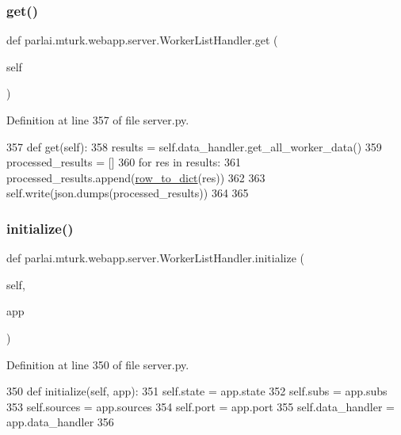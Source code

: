\subsubsection{\texorpdfstring{get()}{get()}}
{\footnotesize\ttfamily def parlai.\+mturk.\+webapp.\+server.\+Worker\+List\+Handler.\+get (\begin{DoxyParamCaption}\item[{}]{self }\end{DoxyParamCaption})}



Definition at line 357 of file server.\+py.


\begin{DoxyCode}
357     \textcolor{keyword}{def }get(self):
358         results = self.data\_handler.get\_all\_worker\_data()
359         processed\_results = []
360         \textcolor{keywordflow}{for} res \textcolor{keywordflow}{in} results:
361             processed\_results.append(\hyperlink{namespaceparlai_1_1mturk_1_1webapp_1_1server_a92be47964fa33a4b6a14d4069d091c7d}{row\_to\_dict}(res))
362 
363         self.write(json.dumps(processed\_results))
364 
365 
\end{DoxyCode}
\mbox{\label{classparlai_1_1mturk_1_1webapp_1_1server_1_1WorkerListHandler_ad375655741a045539a790aa1eb8878df}} 
\subsubsection{\texorpdfstring{initialize()}{initialize()}}
{\footnotesize\ttfamily def parlai.\+mturk.\+webapp.\+server.\+Worker\+List\+Handler.\+initialize (\begin{DoxyParamCaption}\item[{}]{self,  }\item[{}]{app }\end{DoxyParamCaption})}



Definition at line 350 of file server.\+py.


\begin{DoxyCode}
350     \textcolor{keyword}{def }initialize(self, app):
351         self.state = app.state
352         self.subs = app.subs
353         self.sources = app.sources
354         self.port = app.port
355         self.data\_handler = app.data\_handler
356 
\end{DoxyCode}


